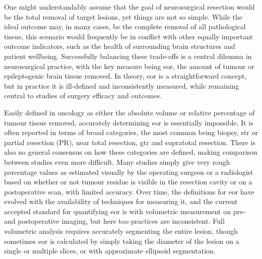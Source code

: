 One might understandably assume that the goal of neurosurgical resection would be the total removal of target lesions, yet things are not so simple.
While the ideal outcome may, in many cases, be the complete removal of all pathological tissue, this scenario would frequently be in conflict with other equally important outcome indicators, such as the health of surrounding brain structures and patient wellbeing.
Successfully balancing these trade-offs is a central dilemma in neurosurgical practice, with the key measure being \gls{eor}, the amount of tumour or epileptogenic brain tissue removed.
In theory, \gls{eor} is a straightforward concept, but in practice it is ill-defined and inconsistently measured, while remaining central to studies of surgery efficacy and outcomes.

Easily defined in oncology as either the absolute volume or relative percentage of tumour tissue removed, accurately determining \gls{eor} is essentially impossible.
It is often reported in terms of broad categories, the most common being biopsy, \gls{str} or partial resection (PR), near total resection, \gls{gtr} and supratotal resection\autocite{Wykes2021,Karschnia2021}.
There is also no general consensus on how these categories are defined, making comparison between studies even more difficult\autocite{Karschnia2021}.
Many studies simply give very rough percentage values as estimated visually by the operating surgeon or a radiologist based on whether or not tumour residue is visible in the resection cavity or on a postoperative scan, with limited accuracy\autocite{Sanai2008,Martino2013,Lau2018,Sezer2020}.
Over time, the definitions for \gls{eor} have evolved with the availability of techniques for measuring it, and the current accepted standard for quantifying \gls{eor} is with volumetric measurement on pre- and postoperative imaging\autocite{Rincon-Torroella2019}, but here too practices are inconsistent\autocite{Wykes2021}.
Full volumetric analysis requires accurately segmenting the entire lesion, though sometimes \gls{eor} is calculated by simply taking the diameter of the lesion on a single or multiple slices, or with approximate ellipsoid segmentation\autocite{Sanai2008,Albuquerque2021}.

